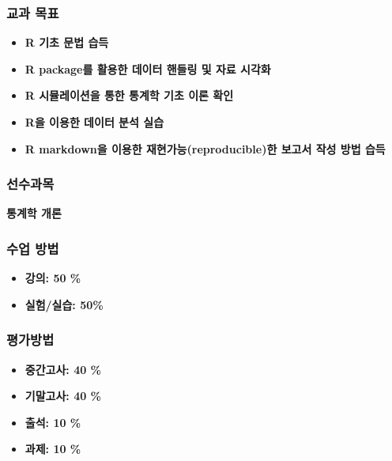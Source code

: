 \documentclass[
  11pt,
]{krantz}
\makeatletter
\providecommand{\tightlist}{%
  \setlength{\itemsep}{0pt}\setlength{\parskip}{0pt}}
\newenvironment{kframe}{%
\medskip{}
\setlength{\fboxsep}{.8em}
 \def\at@end@of@kframe{}%
 \ifinner\ifhmode%
  \def\at@end@of@kframe{\end{minipage}}%
  \begin{minipage}{\columnwidth}%
 \fi\fi%
 \def\FrameCommand##1{\hskip\@totalleftmargin \hskip-\fboxsep
 \colorbox{shadecolor}{##1}\hskip-\fboxsep
     \hskip-\linewidth \hskip-\@totalleftmargin \hskip\columnwidth}%
 \MakeFramed {\advance\hsize-\width
   \@totalleftmargin\z@ \linewidth\hsize
   \@setminipage}}%
 {\par\unskip\endMakeFramed%
 \at@end@of@kframe}
\renewenvironment{quote}{\begin{kframe}}{\end{kframe}}
\makeatother
\begin{document}
\hypertarget{purpose-course}{%
\subsubsection*{교과 목표}\label{purpose-course}}


\begin{quote}
\begin{itemize}
\tightlist
\item
  \textbf{R 기초 문법 습득}
\item
  \textbf{R package를 활용한 데이터 핸들링 및 자료 시각화}
\item
  \textbf{R 시뮬레이션을 통한 통계학 기초 이론 확인}
\item
  \textbf{R을 이용한 데이터 분석 실습}
\item
  \textbf{R markdown을 이용한 재현가능(reproducible)한 보고서 작성 방법 습득}
\end{itemize}
\end{quote}

\hypertarget{pre-course}{%
\subsubsection*{선수과목}\label{pre-course}}


\begin{quote}
\textbf{통계학 개론}
\end{quote}

\hypertarget{course-method}{%
\subsubsection*{수업 방법}\label{course-method}}


\begin{itemize}
\tightlist
\item
  \textbf{강의: 50 \%}
\item
  \textbf{실험/실습: 50\%}
\end{itemize}

\hypertarget{grade-method}{%
\subsubsection*{평가방법}\label{grade-method}}


\begin{quote}
\begin{itemize}
\tightlist
\item
  \textbf{중간고사: 40 \%}
\item
  \textbf{기말고사: 40 \%}
\item
  \textbf{출석: 10 \%}
\item
  \textbf{과제: 10 \%}
\end{itemize}
\end{quote}
\end{document}
